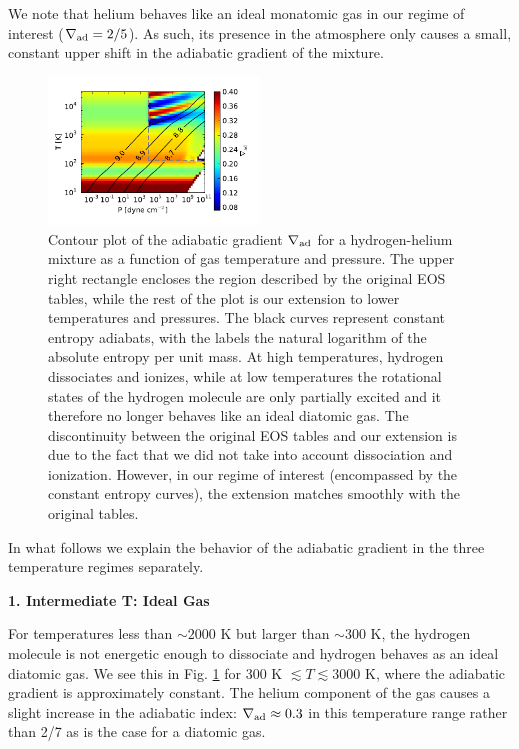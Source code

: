 \documentclass[apj]{emulateapj}
\newcommand{\delad}{\nabla_{\rm ad}}
\begin{document}
We note that helium behaves like an ideal monatomic gas in our regime of interest ($\delad=2/5$). As such, its presence in the atmosphere only causes a small, constant upper shift in the adiabatic gradient of the mixture.

\begin{figure}[h]
\centering
\includegraphics[width=0.5\textwidth]{../../figs/EOS/delad_S_mixt.pdf}
\caption{Contour plot of the adiabatic gradient $\delad$ for a hydrogen-helium mixture as a function of gas temperature and pressure. The upper right rectangle encloses the region described by the original \citet{saumon95} EOS tables, while the rest of the plot is our extension to lower temperatures and pressures. The black curves represent constant entropy adiabats, with the labels the natural logarithm of the absolute entropy per unit mass. At high temperatures, hydrogen dissociates and ionizes, while at low temperatures the rotational states of the hydrogen molecule are only partially excited and it therefore no longer behaves like an ideal diatomic gas. The discontinuity between the original EOS tables and our extension is due to the fact that we did not take into account dissociation and ionization. However, in our regime of interest (encompassed by the constant entropy curves), the extension matches smoothly with the original tables.}
\label{fig:deladmap}
\end{figure}

In what follows we explain the behavior of the adiabatic gradient in the three temperature regimes separately.

\vspace{0.2in}

\textbf{1. Intermediate T: Ideal Gas}

For temperatures less than $\sim 2000$ K but larger than $\sim 300$ K, the hydrogen molecule is not energetic enough to dissociate and hydrogen behaves as an ideal diatomic gas. We see this in Fig. \ref{fig:deladmap} for 300 K $\lesssim T \lesssim 3000$ K, where the adiabatic gradient is approximately constant. The helium component of the gas causes a slight increase in the adiabatic index: $\delad \approx 0.3$ in this temperature range rather than 2/7 as is the case for a diatomic gas.
\end{document}
